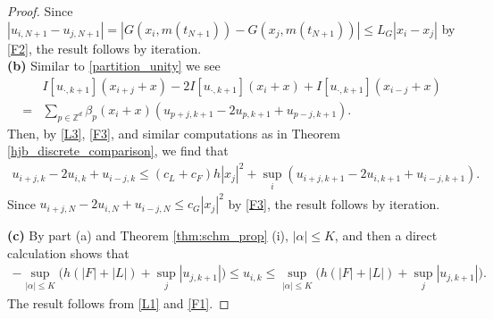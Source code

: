 \documentclass[a4paper,  twoside, 10pt, leqno]{amsart}
\newcommand{\Z}{\mathbb{Z}}
\theoremstyle{remark}
\theoremstyle{definition}
\begin{document}
\begin{proof}
Since 
$|u_{i,N+1} - u_{j,N+1} | = | G (x_i, m(t_{N+1}) ) - G (x_j,
m(t_{N+1}) ) | \leq L_G |x_i - x_j|$ by \ref{F2}, the result follows
by iteration. \\[0.2cm]
\noindent \textbf{(b)} Similar to \eqref{partition_unity} we see
\begin{align*}
    &I [u_{\cdot, k+1}] (x_{i+j} + x) - 2 I[u_{\cdot,k+1}](x_i + x) + I [u_{\cdot, k+1}] (x_{i-j} + x) \\
  = &  \sum_{p \in \Z^d} \beta_p (x_i +x) (u_{p+j,k+1} - 2 u_{p,k+1} + u_{p-j, k+1} ) .
\end{align*}
Then, by \ref{L3}, \ref{F3}, and similar
computations as in Theorem \ref{hjb_discrete_comparison}, we find that
\begin{align*}%
    u_{i+j,k} - 2 u_{i,k} + u_{i-j,k} \leq ( c_L + c_{F}  )h |x_j|^2  + \sup_i(u_{i+j,k+1} - 2 u_{i,k+1} + u_{i-j,k+1}). 
\end{align*}
Since $u_{i+j,N} - 2 u_{i,N} + u_{i-j,N}\leq c_G|x_j|^2$ by
\ref{F3}, the result follows by iteration. 


  \smallskip
  

\noindent 
\textbf{(c)}  By part (a) and Theorem \ref{thm:schm_prop} (i),
$|\alpha|\leq K$, and then a direct calculation shows that
  \begin{align*}
- \sup_{|\alpha|\leq K}\Big( h (|F|+|L|) + \sup_j|u_{j,k+1}|  \Big)\leq  u_{i,k} \leq \sup_{|\alpha|\leq K}\Big( h (|F|+|L|) + \sup_j|u_{j,k+1}|  \Big).
    \end{align*}
The result follows from \ref{L1} and \ref{F1}. 
\end{proof}
\end{document}
